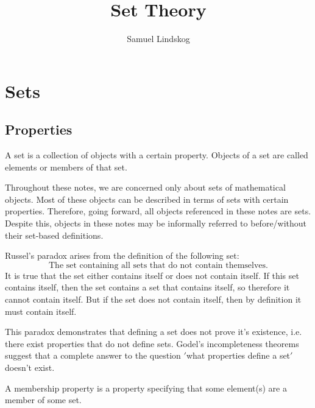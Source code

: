 \documentclass{article}
\title{Set Theory}
\author{Samuel Lindskog}
\begin{document}
\maketitle
{}
\tableofcontents
{}
\clearpage
{}
\setcounter{page}{1}

\section{Sets}
\subsection{Properties}
\begin{definition}[Set]
	A set is a collection of objects with a certain property. Objects of a set are called elements or members of that set.
\end{definition}
\begin{remark}
	Throughout these notes, we are concerned only about sets of mathematical objects. Most of these objects can be described in terms of sets with certain properties. Therefore, going forward, all objects referenced in these notes are sets. Despite this, objects in these notes may be informally referred to before/without their set-based definitions.
\end{remark}
\begin{proposition}
	Russel's paradox arises from the definition of the following set:
	\begin{equation*}
		\text{The set containing all sets that do not contain themselves.}
	\end{equation*}
	It is true that the set either contains itself or does not contain itself. If this set contains itself, then the set contains a set that contains itself, so therefore it cannot contain itself. But if the set does not contain itself, then by definition it must contain itself.
\end{proposition}
\begin{remark}
	This paradox demonstrates that defining a set does not prove it's existence, i.e. there exist properties that do not define sets. Godel's incompleteness theorems suggest that a complete answer to the question $'$what properties define a set$'$ doesn't exist.
\end{remark}
\begin{definition}
	A membership property is a property specifying that some element(s) are a member of some set.
\end{definition}
\end{document}
